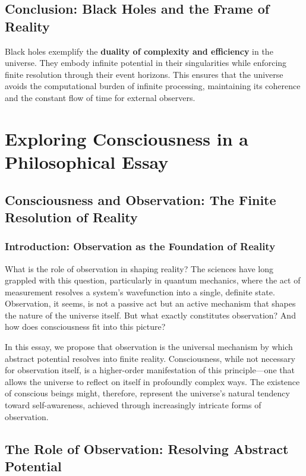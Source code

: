 \documentclass[12pt]{article}
\begin{document}
\subsection{Conclusion: Black Holes and the Frame of Reality}

Black holes exemplify the \textbf{duality of complexity and efficiency} in the universe. They embody infinite potential in their singularities while enforcing finite resolution through their event horizons. This ensures that the universe avoids the computational burden of infinite processing, maintaining its coherence and the constant flow of time for external observers.


\section{Exploring Consciousness in a Philosophical Essay}

\subsection{Consciousness and Observation: The Finite Resolution of Reality}

\subsubsection{Introduction: Observation as the Foundation of Reality}

What is the role of observation in shaping reality? The sciences have long grappled with this question, particularly in quantum mechanics, where the act of measurement resolves a system's wavefunction into a single, definite state. Observation, it seems, is not a passive act but an active mechanism that shapes the nature of the universe itself. But what exactly constitutes observation? And how does consciousness fit into this picture?

In this essay, we propose that observation is the universal mechanism by which abstract potential resolves into finite reality. Consciousness, while not necessary for observation itself, is a higher-order manifestation of this principle—one that allows the universe to reflect on itself in profoundly complex ways. The existence of conscious beings might, therefore, represent the universe’s natural tendency toward self-awareness, achieved through increasingly intricate forms of observation.

\subsection{The Role of Observation: Resolving Abstract Potential}
\end{document}
